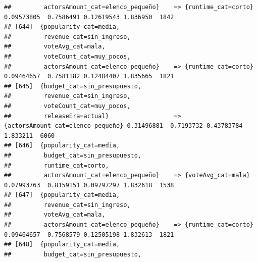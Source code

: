 \documentclass[
]{article}
\begin{document}
\begin{verbatim}
##         actorsAmount_cat=elenco_pequeño}    => {runtime_cat=corto}               0.09573805  0.7586491 0.12619543 1.836950  1842
## [644]  {popularity_cat=media,                                                                                                   
##         revenue_cat=sin_ingreso,                                                                                                
##         voteAvg_cat=mala,                                                                                                       
##         voteCount_cat=muy_pocos,                                                                                                
##         actorsAmount_cat=elenco_pequeño}    => {runtime_cat=corto}               0.09464657  0.7581182 0.12484407 1.835665  1821
## [645]  {budget_cat=sin_presupuesto,                                                                                             
##         revenue_cat=sin_ingreso,                                                                                                
##         voteCount_cat=muy_pocos,                                                                                                
##         releaseEra=actual}                  => {actorsAmount_cat=elenco_pequeño} 0.31496881  0.7193732 0.43783784 1.833211  6060
## [646]  {popularity_cat=media,                                                                                                   
##         budget_cat=sin_presupuesto,                                                                                             
##         runtime_cat=corto,                                                                                                      
##         actorsAmount_cat=elenco_pequeño}    => {voteAvg_cat=mala}                0.07993763  0.8159151 0.09797297 1.832618  1538
## [647]  {popularity_cat=media,                                                                                                   
##         revenue_cat=sin_ingreso,                                                                                                
##         voteAvg_cat=mala,                                                                                                       
##         actorsAmount_cat=elenco_pequeño}    => {runtime_cat=corto}               0.09464657  0.7568579 0.12505198 1.832613  1821
## [648]  {popularity_cat=media,                                                                                                   
##         budget_cat=sin_presupuesto,                                                                                             

\end{verbatim}
\end{document}
